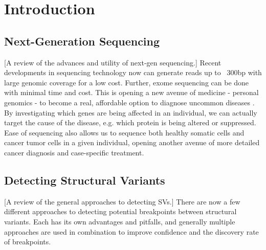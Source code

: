 \documentclass{easychithesis}
\begin{document}
%
%

\tableofcontents

%
% 

\listoffigures

% 
% 

\listoftables

%
%
\mainmatter

%
%
\chapter{Introduction}
\section{Next-Generation Sequencing}
[A review of the advances and utility of next-gen sequencing.] Recent developments in sequencing technology now can generate reads up to ~300bp with large genomic coverage for a low cost. Further, exome sequencing can be done with minimal time and cost. This is opening a new avenue of medicine - personal genomics - to become a real, affordable option to diagnose uncommon diseases \cite{pabinger2014survey, feuk2006structural}. By investigating which genes are being affected in an individual, we can actually target the cause of the disease, e.g. which protein is being altered or suppressed. Ease of sequencing also allows us to sequence both healthy somatic cells and cancer tumor cells in a given individual, opening another avenue of more detailed cancer diagnosis and case-specific treatment.

\section{Detecting Structural Variants}
[A review of the general approaches to detecting SVs.] There are now a few different approaches to detecting potential breakpoints between structural variants. Each has its own advantages and pitfalls, and generally multiple approaches are used in combination to improve confidence and the discovery rate of breakpoints.
\end{document}
